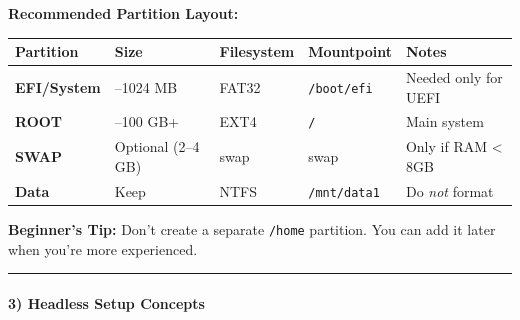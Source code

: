 \documentclass[
  english,
  paper=a4,
  oneside  ,captions=tableheading
]{scrartcl}
\newcounter{none} %
\renewenvironment{quote}{\begin{customblockquote}\list{}{\rightmargin=0em\leftmargin=0em}%
\item\relax\color{blockquote-text}\ignorespaces}{\unskip\unskip\endlist\end{customblockquote}}
\begin{document}
\textbf{Recommended Partition Layout:}

{\def\LTcaptype{none} %
\begin{longtable}[]{@{}
  >{\raggedright\arraybackslash}p{}
  >{\raggedright\arraybackslash}p{}
  >{\raggedright\arraybackslash}p{}
  >{\raggedright\arraybackslash}p{}
  >{\raggedright\arraybackslash}p{}@{}}
\toprule\noalign{}
\begin{minipage}[b]{\linewidth}\raggedright
Partition
\end{minipage} & \begin{minipage}[b]{\linewidth}\raggedright
Size
\end{minipage} & \begin{minipage}[b]{\linewidth}\raggedright
Filesystem
\end{minipage} & \begin{minipage}[b]{\linewidth}\raggedright
Mountpoint
\end{minipage} & \begin{minipage}[b]{\linewidth}\raggedright
Notes
\end{minipage} \\
\midrule\noalign{}
\endhead
\bottomrule\noalign{}
\endlastfoot
\textbf{EFI/System} & 512--1024 MB & FAT32 & \texttt{/boot/efi} & Needed
only for UEFI \\
\textbf{ROOT} & 40--100 GB+ & EXT4 & \texttt{/} & Main system \\
\textbf{SWAP} & Optional (2--4 GB) & swap & swap & Only if RAM
\textless{} 8GB \\
\textbf{Data} & Keep & NTFS & \texttt{/mnt/data1} & Do \emph{not}
format \\
\end{longtable}
}

\begin{quote}
\textbf{Beginner's Tip:} Don't create a separate \texttt{/home}
partition. You can add it later when you're more experienced.
\end{quote}

\begin{center}\rule{0.5\linewidth}{0.5pt}\end{center}

\paragraph{3) Headless Setup Concepts}\label{headless-setup-concepts}
\end{document}
